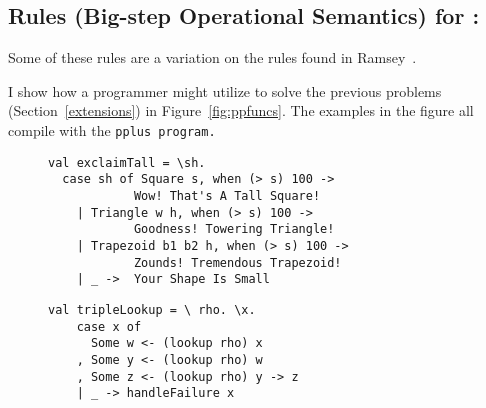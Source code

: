 \documentclass[manuscript,screen,review, 12pt, nonacm]{acmart}
\begin{document}
    \subsection{Rules (Big-step Operational Semantics) for \PPlus:}
    \label{ppsemantics}
    
    Some of these rules are a variation on the rules found in Ramsey~\cite{bpc}.   
    
      \ppsemantics 
      
      \bigskip 
    
    I show how a programmer might utilize \PPlus to solve the previous problems
    (Section~\ref{extensions}) in Figure~\ref{fig:ppfuncs}. The examples in the
    figure all compile with the \tt{pplus} program. 

    \begin{figure}[ht] 
      \begin{minipage}[h]{0.54\linewidth}
        \pplst 
        \begin{lstlisting}[numbers=none, basicstyle=\tiny, xleftmargin=.2em,
          showstringspaces=false,
          frame=single]
val exclaimTall = \sh.
  case sh of Square s, when (> s) 100 -> 
            Wow! That's A Tall Square!  
    | Triangle w h, when (> s) 100 ->
            Goodness! Towering Triangle!
    | Trapezoid b1 b2 h, when (> s) 100 -> 
            Zounds! Tremendous Trapezoid!
    | _ ->  Your Shape Is Small
  \end{lstlisting}
          \label{fig:ppexclaimtall} 
      \end{minipage}%
      \begin{minipage}[h]{0.5\linewidth}
        \pplst 
        \begin{lstlisting}[numbers=none, basicstyle=\tiny, xleftmargin=2em,
                      frame=single]
  val tripleLookup = \ rho. \x.
    case x of 
      Some w <- (lookup rho) x
    , Some y <- (lookup rho) w
    , Some z <- (lookup rho) y -> z
    | _ -> handleFailure x


\end{lstlisting}
\end{minipage}
\end{figure}
\end{document}
